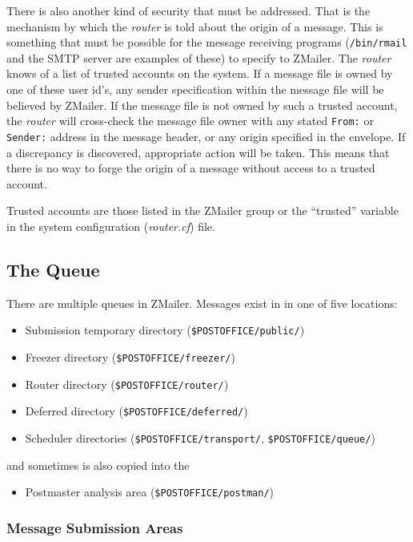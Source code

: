 There is also another kind of security that must be addressed.  That is the
mechanism by which the {\em router\/} is told about the origin of a message.  This
is something that must be possible for the message receiving programs
({\tt /bin/rmail} and the SMTP server are examples of these) to specify to
ZMailer.  The {\em router\/} knows of a list of trusted accounts on the system.  If
a message file is owned by one of these user id's, any sender specification
within the message file will be believed by ZMailer.  If the message file
is not owned by such a trusted account, the {\em router\/} will cross-check the
message file owner with any stated {\tt From:} or {\tt Sender:} address 
in the message header, or any origin specified in the envelope.  If a 
discrepancy is discovered, appropriate action will be taken.  This means 
that there is no way to forge the origin of a message without access to a 
trusted account.

Trusted accounts are those listed in the ZMailer group or the ``trusted'' 
variable in the system configuration ({\em router.cf\/}) file.



\subsection{The Queue}

There are multiple queues in ZMailer. Messages exist in
in one of five locations:

\begin{itemize}
\item Submission temporary directory ({\tt \$POSTOFFICE/public/})
\item Freezer directory ({\tt \$POSTOFFICE/freezer/})
\item Router directory ({\tt \$POSTOFFICE/router/})
\item Deferred directory ({\tt \$POSTOFFICE/deferred/})
\item Scheduler directories ({\tt \$POSTOFFICE/transport/}, 
{\tt \$POSTOFFICE/queue/})
\end{itemize}

and sometimes is also copied into the 
\begin{itemize}
\item Postmaster analysis area ({\tt \$POSTOFFICE/postman/})
\end{itemize}



\subsubsection{Message Submission Areas}



